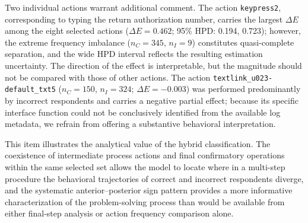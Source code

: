 Two individual actions warrant additional comment. The action \texttt{keypress2}, corresponding to typing the return authorization number, carries the largest $\Delta E$ among the eight selected actions ($\Delta E = 0.462$; 95\% HPD: 0.194, 0.723); however, the extreme frequency imbalance ($n_C = 345$, $n_I = 9$) constitutes quasi-complete separation, and the wide HPD interval reflects the resulting estimation uncertainty. The direction of the effect is interpretable, but the magnitude should not be compared with those of other actions. The action \texttt{textlink\_u023-default\_txt5} ($n_C = 150$, $n_I = 324$; $\Delta E = -0.003$) was performed predominantly by incorrect respondents and carries a negative partial effect; because its specific interface function could not be conclusively identified from the available log metadata, we refrain from offering a substantive behavioral interpretation.

This item illustrates the analytical value of the hybrid classification. The coexistence of intermediate process actions and final confirmatory operations within the same selected set allows the model to locate where in a multi-step procedure the behavioral trajectories of correct and incorrect respondents diverge, and the systematic anterior--posterior sign pattern provides a more informative characterization of the problem-solving process than would be available from either final-step analysis or action frequency comparison alone.
